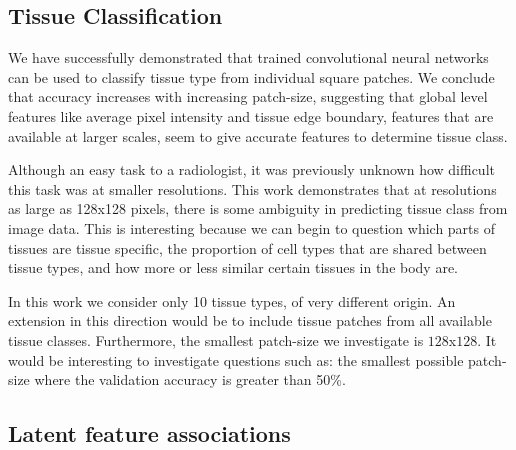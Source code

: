 \documentclass[graybox]{svmult}
\begin{document}
\subsection{Tissue Classification}


We have successfully demonstrated that trained convolutional neural networks can be used to classify tissue type from individual square patches. We conclude that accuracy increases with increasing patch-size, suggesting that global level features like average pixel intensity and tissue edge boundary, features that are available at larger scales, seem to give accurate features to determine tissue class.

Although an easy task to a radiologist, it was previously unknown how difficult this task was at smaller resolutions. This work demonstrates that at resolutions as large as 128x128 pixels, there is some ambiguity in predicting tissue class from image data. This is interesting because we can begin to question which parts of tissues are tissue specific, the proportion of cell types that are shared between tissue types, and how more or less similar certain tissues in the body are.

In this work we consider only 10 tissue types, of very different origin. An extension in this direction would be to include tissue patches from all available tissue classes. Furthermore, the smallest patch-size we investigate is $128$x$128$. It would be interesting to investigate questions such as: the smallest possible patch-size where the validation accuracy is greater than 50\%.




\subsection{Latent feature associations}
\end{document}
